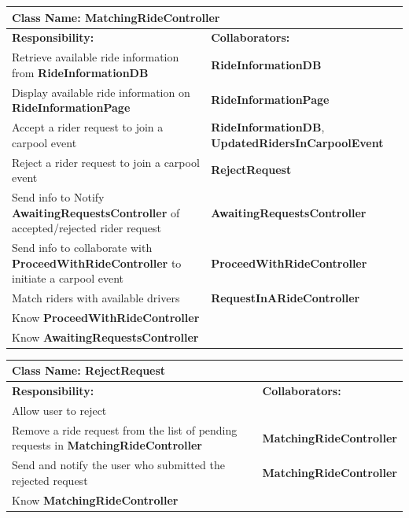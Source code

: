\documentclass[]{article}
\begin{document}
\begin{table}[H]
    \centering
    \begin{tabular}{|p{5cm}|p{5cm}|}
    \hline 
     \multicolumn{2}{|l|}{\textbf{Class Name:} MatchingRideController} \\
    \hline
    \textbf{Responsibility:} & \textbf{Collaborators:} \\
    \hline
    Retrieve available ride information from \textbf{RideInformationDB} & \textbf{RideInformationDB} \\
    \hline
    Display available ride information on \textbf{RideInformationPage} & \textbf{RideInformationPage} \\
    \hline
    Accept a rider request to join a carpool event & \textbf{RideInformationDB}, \textbf{UpdatedRidersInCarpoolEvent} \\
    \hline
    Reject a rider request to join a carpool event & \textbf{RejectRequest} \\
    \hline
    Send info to Notify \textbf{AwaitingRequestsController} of accepted/rejected rider request & \textbf{AwaitingRequestsController} \\
    \hline
    Send info to collaborate with \textbf{ProceedWithRideController} to initiate a carpool event & \textbf{ProceedWithRideController} \\
    \hline
    Match riders with available drivers & \textbf{RequestInARideController} \\ 
    \hline
     Know \textbf{ProceedWithRideController}  & \phantom{} \\
    \hline
     Know \textbf{AwaitingRequestsController}  & \phantom{} \\
    \hline
    \end{tabular}
\end{table}

\begin{table}[H]
    \centering
    \begin{tabular}{|p{5cm}|p{5cm}|}
    \hline
    \multicolumn{2}{|l|}{\textbf{Class Name:} RejectRequest} \\
    \hline
    \textbf{Responsibility:} & \textbf{Collaborators:} \\
    \hline
    Allow user to reject &  \phantom{}\\
    Remove a ride request from the list of pending requests in \textbf{MatchingRideController} & \textbf{MatchingRideController} \\
    \hline
    Send and notify the user who submitted the rejected request & \textbf{MatchingRideController}
    \\
    \hline
     Know \textbf{MatchingRideController}  & \phantom{} \\
    \hline
    \end{tabular}
\end{table}
\end{document}
